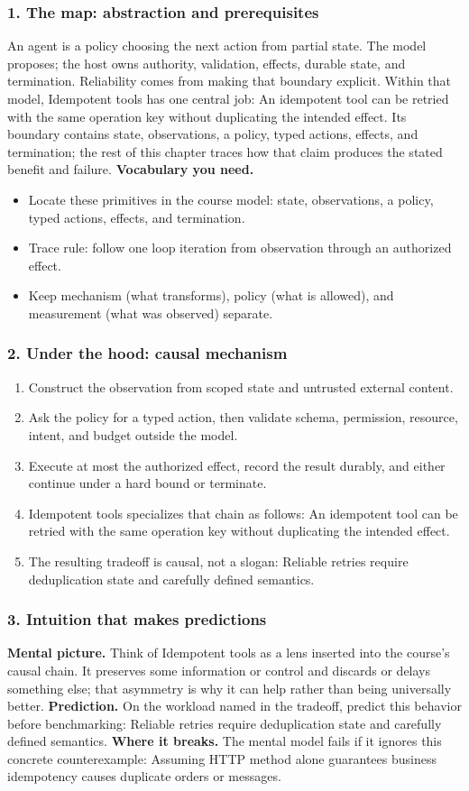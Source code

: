 \subsubsection*{1. The map: abstraction and prerequisites}
An agent is a policy choosing the next action from partial state. The model proposes; the host owns authority, validation, effects, durable state, and termination. Reliability comes from making that boundary explicit.
Within that model, Idempotent tools has one central job: An idempotent tool can be retried with the same operation key without duplicating the intended effect. Its boundary contains state, observations, a policy, typed actions, effects, and termination; the rest of this chapter traces how that claim produces the stated benefit and failure.
\textbf{Vocabulary you need.}\begin{itemize}
\item Locate these primitives in the course model: state, observations, a policy, typed actions, effects, and termination.
\item Trace rule: follow one loop iteration from observation through an authorized effect.
\item Keep mechanism (what transforms), policy (what is allowed), and measurement (what was observed) separate.
\end{itemize}
\subsubsection*{2. Under the hood: causal mechanism}\begin{enumerate}
\item Construct the observation from scoped state and untrusted external content.
\item Ask the policy for a typed action, then validate schema, permission, resource, intent, and budget outside the model.
\item Execute at most the authorized effect, record the result durably, and either continue under a hard bound or terminate.
\item Idempotent tools specializes that chain as follows: An idempotent tool can be retried with the same operation key without duplicating the intended effect.
\item The resulting tradeoff is causal, not a slogan: Reliable retries require deduplication state and carefully defined semantics.
\end{enumerate}
\subsubsection*{3. Intuition that makes predictions}
\textbf{Mental picture.} Think of Idempotent tools as a lens inserted into the course's causal chain. It preserves some information or control and discards or delays something else; that asymmetry is why it can help rather than being universally better.
\textbf{Prediction.} On the workload named in the tradeoff, predict this behavior before benchmarking: Reliable retries require deduplication state and carefully defined semantics.
\textbf{Where it breaks.} The mental model fails if it ignores this concrete counterexample: Assuming HTTP method alone guarantees business idempotency causes duplicate orders or messages.
